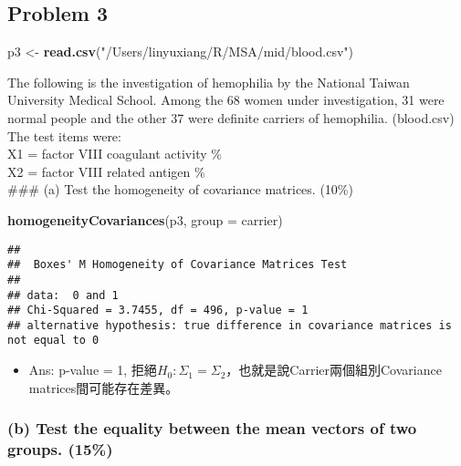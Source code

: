 \documentclass[]{article}
\newenvironment{Shaded}{\begin{snugshade}}{\end{snugshade}}
\newcommand{\DataTypeTok}[1]{\textcolor[rgb]{0.13,0.29,0.53}{#1}}
\newcommand{\KeywordTok}[1]{\textcolor[rgb]{0.13,0.29,0.53}{\textbf{#1}}}
\newcommand{\NormalTok}[1]{#1}
\newcommand{\StringTok}[1]{\textcolor[rgb]{0.31,0.60,0.02}{#1}}
\providecommand{\tightlist}{%
  \setlength{\itemsep}{0pt}\setlength{\parskip}{0pt}}
\begin{document}
\hypertarget{problem-3}{%
\subsection{Problem 3}\label{problem-3}}

\begin{Shaded}
\begin{Highlighting}[]
\NormalTok{p3 <-}\StringTok{ }\KeywordTok{read.csv}\NormalTok{(}\StringTok{"/Users/linyuxiang/R/MSA/mid/blood.csv"}\NormalTok{)}
\end{Highlighting}
\end{Shaded}

The following is the investigation of hemophilia by the National Taiwan
University Medical School. Among the 68 women under investigation, 31
were normal people and the other 37 were definite carriers of
hemophilia. (blood.csv) The test items were:\\
X1 = factor VIII coagulant activity \%\\
X2 = factor VIII related antigen \%\\
\#\#\# (a) Test the homogeneity of covariance matrices. (10\%)

\begin{Shaded}
\begin{Highlighting}[]
\KeywordTok{homogeneityCovariances}\NormalTok{(p3, }\DataTypeTok{group =}\NormalTok{ carrier)}
\end{Highlighting}
\end{Shaded}

\begin{verbatim}
## 
##  Boxes' M Homogeneity of Covariance Matrices Test
## 
## data:  0 and 1
## Chi-Squared = 3.7455, df = 496, p-value = 1
## alternative hypothesis: true difference in covariance matrices is not equal to 0
\end{verbatim}

\begin{itemize}
\tightlist
\item
  Ans: p-value = 1,
  拒絕\(H_0: \Sigma_1 = \Sigma_2\)，也就是說Carrier兩個組別Covariance
  matrices間可能存在差異。
\end{itemize}

\hypertarget{b-test-the-equality-between-the-mean-vectors-of-two-groups.-15}{%
\subsubsection{(b) Test the equality between the mean vectors of two
groups.
(15\%)}\label{b-test-the-equality-between-the-mean-vectors-of-two-groups.-15}}
\end{document}
